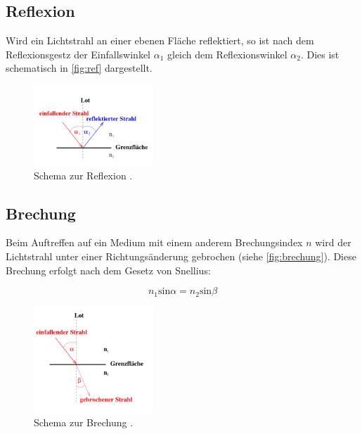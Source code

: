     \subsection{Reflexion}

        \noindent Wird ein Lichtstrahl an einer ebenen Fläche reflektiert, so ist nach dem Reflexionsgestz der Einfallswinkel $\alpha_1$ gleich dem
        Reflexionswinkel $\alpha_2$. Dies ist schematisch in \autoref{fig:ref} dargestellt.

        \begin{figure}[H]
            \centering
            \includegraphics[width=0.4\textwidth]{images/pic2.PNG}
            \caption{Schema zur Reflexion \cite{400}.}
            \label{fig:ref}
        \end{figure}

    \subsection{Brechung}

        \noindent Beim Auftreffen auf ein Medium mit einem anderem Brechungsindex $n$ wird der Lichtstrahl unter einer Richtungsänderung gebrochen (siehe \autoref{fig:brechung}). Diese Brechung erfolgt nach dem Gesetz von Snellius:

        \begin{equation}
            n_1 \text{sin} \alpha = n_2 \text{sin} \beta
        \end{equation}

        \begin{figure}[H]
            \centering
            \includegraphics[width=0.4\textwidth]{images/pic3.PNG}
            \caption{Schema zur Brechung \cite{400}.}
           \label{fig:brechung}
        \end{figure}

